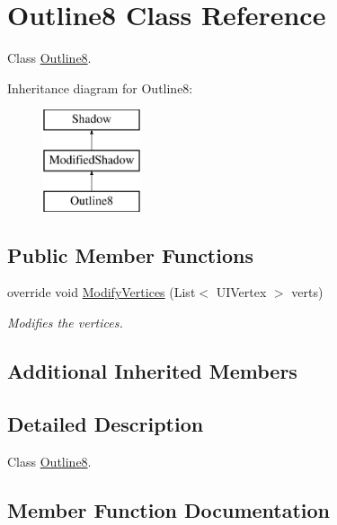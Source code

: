 \hypertarget{class_outline8}{}\section{Outline8 Class Reference}
\label{class_outline8}


Class \hyperlink{class_outline8}{Outline8}.  


Inheritance diagram for Outline8\+:\begin{figure}[H]
\begin{center}
\leavevmode
\includegraphics[height=3.000000cm]{class_outline8}
\end{center}
\end{figure}
\subsection*{Public Member Functions}
\begin{DoxyCompactItemize}
\item 
override void \hyperlink{class_outline8_a519d28a745afb06c930d467a308c49dc}{Modify\+Vertices} (List$<$ U\+I\+Vertex $>$ verts)
\begin{DoxyCompactList}\small\item\em Modifies the vertices. \end{DoxyCompactList}\end{DoxyCompactItemize}
\subsection*{Additional Inherited Members}


\subsection{Detailed Description}
Class \hyperlink{class_outline8}{Outline8}. 



\subsection{Member Function Documentation}
\mbox{\label{class_outline8_a519d28a745afb06c930d467a308c49dc}} 
